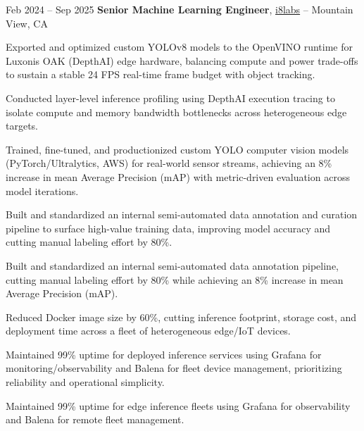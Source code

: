         \vspace{0.12 cm}
        \begin{twocolentry}{
            Feb 2024 – Sep 2025
        }
            \textbf{Senior Machine Learning Engineer}, \href{https://i8labs.com/}{i8labs} -- Mountain View, CA\end{twocolentry}
        \vspace{0.06 cm}
        \begin{onecolentry}
            \begin{highlights}
                \item Exported and optimized custom YOLOv8 models to the OpenVINO runtime for Luxonis OAK (DepthAI) edge hardware, balancing compute and power trade-offs to sustain a stable 24 FPS real-time frame budget with object tracking.
                \item Conducted layer-level inference profiling using DepthAI execution tracing to isolate compute and memory bandwidth bottlenecks across heterogeneous edge targets.
                \item Trained, fine-tuned, and productionized custom YOLO computer vision models (PyTorch/Ultralytics, AWS) for real-world sensor streams, achieving an 8\% increase in mean Average Precision (mAP) with metric-driven evaluation across model iterations.
                \item Built and standardized an internal semi-automated data annotation and curation pipeline to surface high-value training data, improving model accuracy and cutting manual labeling effort by 80\%.
                \item Built and standardized an internal semi-automated data annotation pipeline, cutting manual labeling effort by 80\% while achieving an 8\% increase in mean Average Precision (mAP).
                \item Reduced Docker image size by 60\%, cutting inference footprint, storage cost, and deployment time across a fleet of heterogeneous edge/IoT devices.
                \item Maintained 99\% uptime for deployed inference services using Grafana for monitoring/observability and Balena for fleet device management, prioritizing reliability and operational simplicity.
                \item Maintained 99\% uptime for edge inference fleets using Grafana for observability and Balena for remote fleet management.
            \end{highlights}
        \end{onecolentry}

